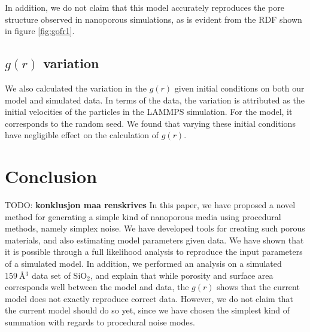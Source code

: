 \documentclass[aps,pre,twocolumn,letterpaper,floatfix,showpacs]{revtex4}
\newcommand{\todo}[1]{ {\color{Magenta} TODO: \color{Blue} \textbf{#1} }}
\begin{document}
In addition, we do not claim that this model accurately reproduces the pore structure observed in nanoporous simulations, as is evident from the RDF shown in figure \ref{fig:gofr1}.

\subsection{$g(r)$ variation}
We also calculated the variation in the $g(r)$ given initial conditions on both our model and simulated data. In terms of the data, the variation is attributed as the initial velocities of the particles in the LAMMPS simulation. For the model, it corresponds to the random seed. We found that varying these initial conditions have negligible effect on the calculation of $g(r)$.





\section{Conclusion}
\todo{konklusjon maa renskrives}
In this paper, we have proposed a novel method for generating a simple kind of nanoporous media using procedural methods, namely simplex noise. We have developed tools for creating such porous materials, and also estimating model parameters given data. We have shown that it is possible through a full likelihood analysis to reproduce the input parameters of a simulated model. In addition, we performed an analysis on a simulated $\SI{159}{\angstrom^{3}}$ data set of SiO$_2$, and explain that while porosity and surface area corresponds well between the model and data, the $g(r)$ shows that the current model does not exactly reproduce correct data. However, we do not claim that the current model should do so yet, since we have chosen the simplest kind of summation with regards to procedural noise modes. 
\end{document}
